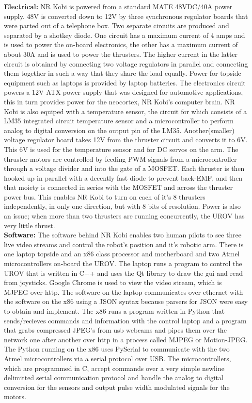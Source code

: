 \documentclass{article}
\begin{document}
\noindent
{\bf Electrical:}
NR Kobi is powered from a standard MATE 48VDC/40A power supply. 48V is converted down to 12V by three synchronous regulator boards that were parted out of a telephone box. Two separate circuits are produced and separated by a shotkey diode. One circuit has a maximum current of 4 amps and is used to power the on-board electronics, the other has a maximum current of about 30A and is used to power the thrusters. The higher current in the latter circuit is obtained by connecting two voltage regulators in parallel and connecting them together in such a way that they share the load equally. Power for topside equipment such as laptops is provided by laptop batteries. The electronics circuit powers a 12V ATX power supply that was designed for automotive applications, this in turn provides power for the neocortex, NR Kobi's computer brain. NR Kobi is also equiped with a temperature sensor, the circuit for which consists of a LM35 integrated circuit temperature sensor and a microcontroller to perform analog to digital conversion on the output pin of the LM35. Another(smaller) voltage regulator board takes 12V from the thruster circuit and converts it to 6V. This 6V is used for the temperature sensor and for DC servos on the arm. The thruster motors are controlled by feeding PWM signals from a microcontroller through a voltage divider and into the gate of a MOSFET. Each thruster is then hooked up in parallel with a decently fast diode to prevent back-EMF, and then that moiety is connected in series with the MOSFET and across the thruster power bus. This enables NR Kobi to turn on each of it's 8 thrusters independently, in only one direction, but with 8 bits of resolution. Power is also an issue; when more than two thrusters are running concurrently, the UROV has very little thrust. 
\\

\noindent
{\bf Software:}
The software behind NR Kobi enables two human pilots to see three live video streams and control the robot's position and it's robotic arm. There is one laptop topside and an x86 class processor and motherboard and two Atmel microcontrollers on-board the UROV. The laptop runs a program to control the UROV that is written in C++ and uses the Qt library to draw the gui and read from joysticks. Google Chrome is used to view the video stream, which is MJPEG over http. The software on the laptop communicates over ethernet with the software on the x86 using a JSON syntax because parsers for JSON were easy to obtain and implement. The x86 runs a program written in Python that sends/recieves commands and information with the control laptop and a program that grabs compressed JPEG's from usb webcams and pipes them over the network one after another over http in a process called MJPEG or Motion-JPEG. The Python running on the x86 uses PySerial to communicate with the two Atmel microcontrollers via a serial protocol over USB. The microcontrollers, which are programmed in C, accept commands over a very simple newline delimitted serial communication protocol and handle the analog to digital conversion for the sensors and output pulse width modulated signals for the motors. 
\end{document}
